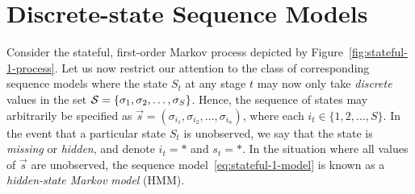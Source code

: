 \documentclass[a4paper]{article}
\begin{document}
\section{Discrete-state Sequence Models}

Consider the stateful, first-order Markov process depicted by Figure~\ref{fig:stateful-1-process}.
Let us now restrict our attention to the class of corresponding sequence models where
the state $S_t$ at any stage $t$ may now only take {\em discrete} values in the set 
${\cal S}=\{\sigma_1,\sigma_2,\ldots,\sigma_S\}$.
Hence, the sequence of states may arbitrarily be specified as $\vec{s}=(\sigma_{i_1},\sigma_{i_2},\ldots,\sigma_{i_n})$,
where each $i_t\in\{1,2,\ldots,S\}$.
In the event that a particular state $S_t$ is unobserved, we say that the state is {\em missing} or {\em hidden},
and denote $i_t=*$ and $s_t=*$. In the situation where all values of $\vec{s}$ are unobserved,
the sequence model~\eqref{eq:stateful-1-model} is known as a {\em hidden-state Markov model} (HMM).
\end{document}
